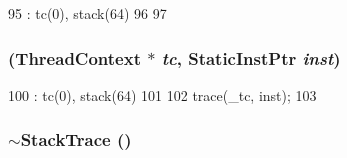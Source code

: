 \begin{DoxyCode}
95     : tc(0), stack(64)
96 {
97 }
\end{DoxyCode}
\hypertarget{classMipsISA_1_1StackTrace_a7c751415d8c87372fc7d24513309cf1b}{
\subsubsection[{StackTrace}]{ ({\bf ThreadContext} $\ast$ {\em tc}, \/  {\bf StaticInstPtr} {\em inst})}}
\label{classMipsISA_1_1StackTrace_a7c751415d8c87372fc7d24513309cf1b}



\begin{DoxyCode}
100     : tc(0), stack(64)
101 {
102     trace(_tc, inst);
103 }
\end{DoxyCode}
\hypertarget{classMipsISA_1_1StackTrace_adec953886bb73db4f2ec91ed12810135}{
\subsubsection[{$\sim$StackTrace}]{\setlength{\rightskip}{0pt plus 5cm}$\sim${\bf StackTrace} ()}}
\label{classMipsISA_1_1StackTrace_adec953886bb73db4f2ec91ed12810135}



